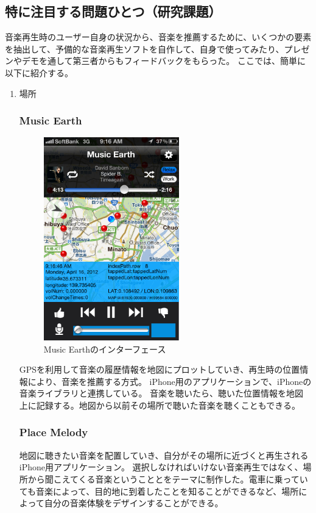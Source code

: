 \documentclass[11pt, twocolumn]{jsarticle}
\begin{document}
\subsection{特に注目する問題ひとつ（研究課題）}
音楽再生時のユーザー自身の状況から、音楽を推薦するために、いくつかの要素を抽出して、予備的な音楽再生ソフトを自作して、自身で使ってみたり、プレゼンやデモを通して第三者からもフィードバックをもらった。
ここでは、簡単に以下に紹介する。
\begin{enumerate}
\item
場所

\subsubsection{Music Earth}

\begin{figure}[h]
\begin{center}
\includegraphics[width=5.866cm]{musicEarth.png}
\caption{Music Earthのインターフェース}
\label{musicEarth_interface}
\end{center}
\end{figure}

GPSを利用して音楽の履歴情報を地図にプロットしていき、再生時の位置情報により、音楽を推薦する方式。
iPhone用のアプリケーションで、iPhoneの音楽ライブラリと連携している。
音楽を聴いたら、聴いた位置情報を地図上に記録する。地図から以前その場所で聴いた音楽を聴くこともできる。

\subsubsection{Place Melody}

地図に聴きたい音楽を配置していき、自分がその場所に近づくと再生されるiPhone用アプリケーション。
選択しなければいけない音楽再生ではなく、場所から聞こえてくる音楽ということとをテーマに制作した。電車に乗っていても音楽によって、目的地に到着したことを知ることができるなど、場所によって自分の音楽体験をデザインすることができる。


\end{enumerate}
\end{document}
